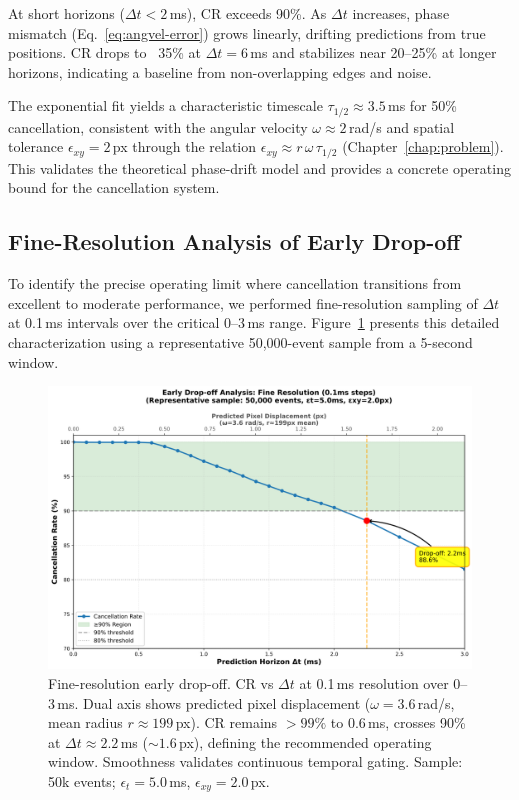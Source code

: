 At short horizons ($\Delta t < 2$\,ms), CR exceeds 90\%. As $\Delta t$ increases, phase mismatch (Eq.~\eqref{eq:angvel-error}) grows linearly, drifting predictions from true positions. CR drops to ~35\% at $\Delta t=6$\,ms and stabilizes near 20--25\% at longer horizons, indicating a baseline from non-overlapping edges and noise.

The exponential fit yields a characteristic timescale $\tau_{1/2} \approx 3.5$\,ms for 50\% cancellation, consistent with the angular velocity $\omega \approx 2$\,rad/s and spatial tolerance $\epsilon_{xy}=2$\,px through the relation $\epsilon_{xy} \approx r\,\omega\,\tau_{1/2}$ (Chapter~\ref{chap:problem}). This validates the theoretical phase-drift model and provides a concrete operating bound for the cancellation system.

\subsection{Fine-Resolution Analysis of Early Drop-off}

To identify the precise operating limit where cancellation transitions from excellent to moderate performance, we performed fine-resolution sampling of $\Delta t$ at 0.1\,ms intervals over the critical 0--3\,ms range. Figure~\ref{fig:fine_dropoff} presents this detailed characterization using a representative 50,000-event sample from a 5-second window.

\begin{figure}[t]
  \centering
  \includegraphics[width=0.95\linewidth]{images/results_figures/fine_resolution_dropoff.png}
\caption{Fine-resolution early drop-off. CR vs $\Delta t$ at 0.1\,ms resolution over 0--3\,ms. Dual axis shows predicted pixel displacement ($\omega=3.6$\,rad/s, mean radius $r\approx 199$\,px). CR remains $>99\%$ to 0.6\,ms, crosses 90\% at $\Delta t \approx 2.2$\,ms ($\sim 1.6$\,px), defining the recommended operating window. Smoothness validates continuous temporal gating. Sample: 50k events; $\epsilon_t=5.0$\,ms, $\epsilon_{xy}=2.0$\,px.
}
  \label{fig:fine_dropoff}
\end{figure}

